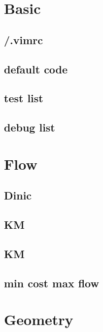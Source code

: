 \section{Basic}

% 
\subsection{/.vimrc}

\subsection{default code}

\subsection{test list}

\subsection{debug list}


\section{Flow}

\subsection{Dinic}

\subsection{KM}

\subsection{KM}

\subsection{min cost max flow}


\section{Geometry}

